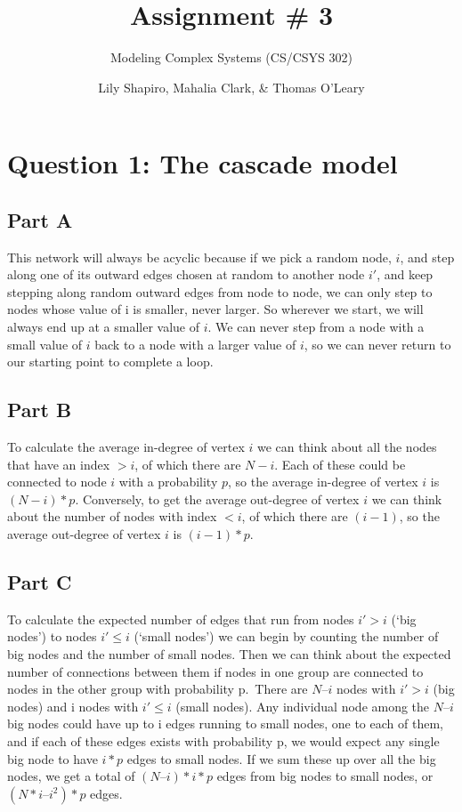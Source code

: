 \documentclass[]{article}
\title{Assignment \# 3}
\subtitle{Modeling Complex Systems (CS/CSYS 302)}
\author{Lily Shapiro, Mahalia Clark, \& Thomas O'Leary}
\date{}
\begin{document}
\maketitle

\hypertarget{question-1-the-cascade-model}{%
\section{Question 1: The cascade
model}\label{question-1-the-cascade-model}}

\hypertarget{part-a}{%
\subsection{Part A}\label{part-a}}

This network will always be acyclic because if we pick a random node,
\(i\), and step along one of its outward edges chosen at random to
another node \(i'\), and keep stepping along random outward edges from
node to node, we can only step to nodes whose value of i is smaller,
never larger. So wherever we start, we will always end up at a smaller
value of \(i\). We can never step from a node with a small value of
\(i\) back to a node with a larger value of \(i\), so we can never
return to our starting point to complete a loop.

\hypertarget{part-b}{%
\subsection{Part B}\label{part-b}}

To calculate the average in-degree of vertex \(i\) we can think about
all the nodes that have an index \(> i\), of which there are \(N - i\).
Each of these could be connected to node \(i\) with a probability \(p\),
so the average in-degree of vertex \(i\) is \((N-i)*p\). Conversely, to
get the average out-degree of vertex \(i\) we can think about the number
of nodes with index \(< i\), of which there are \((i-1)\), so the
average out-degree of vertex \(i\) is \((i-1)*p\).

\hypertarget{part-c}{%
\subsection{Part C}\label{part-c}}

To calculate the expected number of edges that run from nodes \(i' > i\)
(`big nodes') to nodes \(i' \leq i\) (`small nodes') we can begin by
counting the number of big nodes and the number of small nodes. Then we
can think about the expected number of connections between them if nodes
in one group are connected to nodes in the other group with probability
p.~There are \(N–i\) nodes with \(i' > i\) (big nodes) and i nodes with
\(i' \leq i\) (small nodes). Any individual node among the \(N–i\) big
nodes could have up to i edges running to small nodes, one to each of
them, and if each of these edges exists with probability p, we would
expect any single big node to have \(i*p\) edges to small nodes. If we
sum these up over all the big nodes, we get a total of \((N–i)*i*p\)
edges from big nodes to small nodes, or \((N*i–i^2)*p\) edges.
\end{document}

